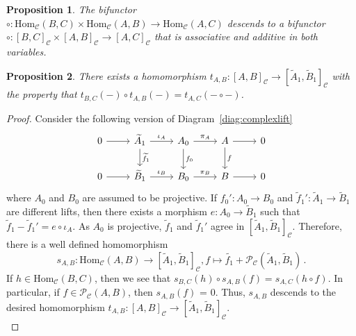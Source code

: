 \documentclass[10pt,a4paper]{amsart}
\newtheorem{prop}{Proposition}
\begin{document}
\begin{prop}\label{prop:biadditive}
The bifunctor $\circ: \mathrm{Hom}_{\mathcal{C}}(B, C) \times \mathrm{Hom}_{\mathcal{C}}(A, B) \rightarrow \mathrm{Hom}_{\mathcal{C}}(A, C)$ descends to a bifunctor $\circ: [B, C]_{\mathcal{C}} \times [A, B]_{\mathcal{C}} \rightarrow [A, C]_{\mathcal{C}}$ that is associative and additive in both variables.
\end{prop}

\begin{prop}\label{prop:transitioning}
There exists a homomorphism $t_{A, B}: [A, B]_{\mathcal{C}} \rightarrow [\widetilde{A}_1, \widetilde{B}_1]_{\mathcal{C}}$ with the property that $t_{B, C}(-) \circ t_{A, B}(-) = t_{A, C}(- \circ -)$.
\end{prop}

\begin{proof}
Consider the following version of Diagram~\ref{diag:complexlift}
\begin{equation}\label{diag:simplelift}
\begin{tikzcd}
    0 \arrow[r] & \widetilde{A}_1 \arrow[r, "\iota_A"] \arrow[d, "\widetilde{f}_1"] & A_0 \arrow[r, "\pi_A"] \arrow[d, "f_0"] & A \arrow[r] \arrow[d, "f"] & 0 \\
    0 \arrow[r] & \widetilde{B}_1 \arrow[r, "\iota_B"] & B_0 \arrow[r, "\pi_B"] & B \arrow[r] & 0
\end{tikzcd}
\end{equation}
where $A_0$ and $B_0$ are assumed to be projective. If $f_0': A_0 \rightarrow B_0$ and $\widetilde{f}_1': \widetilde{A}_1 \rightarrow \widetilde{B}_1$ are different lifts, then there exists a morphism $e: A_0 \rightarrow \widetilde{B}_1$ such that $\widetilde{f}_1-\widetilde{f}_1' = e \circ \iota_A$. As $A_0$ is projective, $\widetilde{f}_1$ and $\widetilde{f}_1'$ agree in $[\widetilde{A}_1, \widetilde{B}_1]_{\mathcal{C}}$. Therefore, there is a well defined homomorphism
\[ s_{A, B}: \mathrm{Hom}_{\mathcal{C}}(A, B) \rightarrow [\widetilde{A}_1, \widetilde{B}_1]_{\mathcal{C}}, f \mapsto \widetilde{f_1}+\mathcal{P}_{\mathcal{C}}(\widetilde{A}_1, \widetilde{B}_1) \, . \]
If $h \in \mathrm{Hom}_{\mathcal{C}}(B, C)$, then we see that $s_{B, C}(h) \circ s_{A, B}(f) = s_{A, C}(h \circ f)$. In particular, if $f \in \mathcal{P}_{\mathcal{C}}(A, B)$, then $s_{A, B}(f)$ = 0. Thus, $s_{A, B}$ descends to the desired homomorphism $t_{A, B}: [A, B]_{\mathcal{C}} \rightarrow [\widetilde{A}_1, \widetilde{B}_1]_{\mathcal{C}}$. \\


\end{proof}
\end{document}
